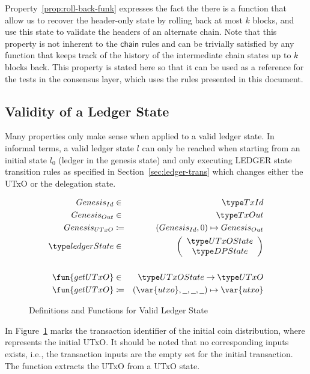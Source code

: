 Property~\ref{prop:roll-back-funk} expresses the fact the there is a function
that allow us to recover the header-only state by rolling back at most $k$
blocks, and use this state to validate the headers of an alternate chain. Note
that this property is not inherent to the $\mathsf{chain}$ rules and can be
trivially satisfied by any function that keeps track of the history of the
intermediate chain states up to $k$ blocks back. This property is stated here
so that it can be used as a reference for the tests in the consensus layer,
which uses the rules presented in this document.


\subsection{Validity of a Ledger State}
\label{sec:valid-ledg-state}

Many properties only make sense when applied to a valid ledger state. In
informal terms, a valid ledger state $l$ can only be reached when starting from
an initial state $l_{0}$ (ledger in the genesis state) and only executing LEDGER
state transition rules as specified in Section~\ref{sec:ledger-trans} which
changes either the UTxO or the delegation state.

\begin{figure}[ht]
  \centering
  \begin{align*}
    \genesisId & \in & \TxId \\
    \genesisTxOut & \in & \TxOut \\
    \genesisUTxO & \coloneqq & (\genesisId, 0) \mapsto \genesisTxOut
    \\
    \ledgerState & \in & \left(
                         \begin{array}{c}
                           \UTxOState \\
                           \DPState
                         \end{array}
    \right)\\
               && \\
    \fun{getUTxO} & \in & \UTxOState \to \UTxO \\
    \fun{getUTxO} & \coloneqq & (\var{utxo}, \wcard, \wcard, \wcard) \mapsto \var{utxo}
  \end{align*}
  \caption{Definitions and Functions for Valid Ledger State}
  \label{fig:valid-ledger}
\end{figure}

In Figure~\ref{fig:valid-ledger} \genesisId{} marks the transaction identifier
of the initial coin distribution, where \genesisTxOut{} represents the initial
UTxO. It should be noted that no corresponding inputs exists, i.e., the
transaction inputs are the empty set for the initial transaction. The function
 extracts the UTxO from a UTxO state.

